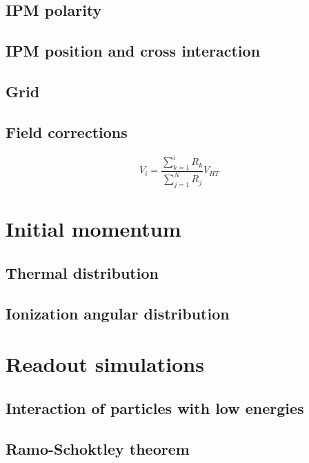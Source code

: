 \begin{refsection}
  \subsection{IPM polarity}


	\subsection{IPM position and cross interaction}
	\subsection{Grid}
	\subsection{Field corrections}

	\begin{equation}
		V_{i} = \frac{\sum_{k = 1}^{i} R_{k}}{\sum_{j = 1}^{N} R_{j}}V_{HT}
	\end{equation}

	


	\section{Initial momentum}
	\subsection{Thermal distribution}
	
	\subsection{Ionization angular distribution}

	\section{Readout simulations}
	\subsection{Interaction of particles with low energies}
	
	\subsection{Ramo-Schoktley theorem}
	\cite[]{Ramo_1939}\cite[]{Shockley_1938}\cite[]{Cavalleri1971}\cite[]{Jen1941}

\end{refsection}

